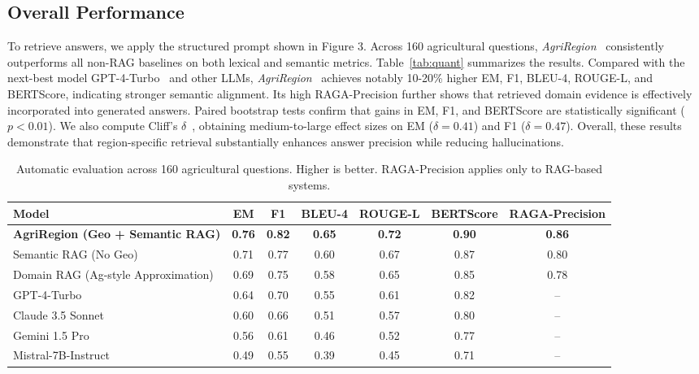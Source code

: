 \documentclass{ieeeaccess}
\newcommand{\AgriRegion}{\textit{AgriRegion}}
\begin{document}
\subsection{Overall Performance}
To retrieve answers, we apply the structured prompt shown in Figure 3. Across 160 agricultural questions, \AgriRegion~ consistently outperforms all non-RAG baselines on both lexical and semantic metrics. Table~\ref{tab:quant} summarizes the results. Compared with the next-best model GPT-4-Turbo~\cite{openai2024gpt4t} and other LLMs, \AgriRegion~ achieves notably 10-20\% higher EM, F1, BLEU-4, ROUGE-L, and BERTScore, indicating stronger semantic alignment. Its high RAGA-Precision further shows that retrieved domain evidence is effectively incorporated into generated answers. Paired bootstrap tests confirm that gains in EM, F1, and BERTScore are statistically significant ($p<0.01$). We also compute Cliff’s $\delta$~\cite{cliff1993dominance}, obtaining medium-to-large effect sizes on EM ($\delta=0.41$) and F1 ($\delta=0.47$). Overall, these results demonstrate that region-specific retrieval substantially enhances answer precision while reducing hallucinations.

\begin{table}[t]
\centering
\caption{Automatic evaluation across 160 agricultural questions. Higher is better. RAGA-Precision applies only to RAG-based systems.}
\begin{tabular}{lcccccc}
\toprule
Model & EM & F1 & BLEU-4 & ROUGE-L & BERTScore & RAGA-Precision \\
\midrule
\textbf{AgriRegion (Geo + Semantic RAG)} & \textbf{0.76} & \textbf{0.82} & \textbf{0.65} & \textbf{0.72} & \textbf{0.90} & \textbf{0.86} \\
\midrule
Semantic RAG (No Geo) & 0.71 & 0.77 & 0.60 & 0.67 & 0.87 & 0.80 \\
Domain RAG (Ag-style Approximation) & 0.69 & 0.75 & 0.58 & 0.65 & 0.85 & 0.78 \\
\midrule
GPT-4-Turbo & 0.64 & 0.70 & 0.55 & 0.61 & 0.82 & -- \\
Claude 3.5 Sonnet & 0.60 & 0.66 & 0.51 & 0.57 & 0.80 & -- \\
Gemini 1.5 Pro & 0.56 & 0.61 & 0.46 & 0.52 & 0.77 & -- \\
Mistral-7B-Instruct & 0.49 & 0.55 & 0.39 & 0.45 & 0.71 & -- \\
\bottomrule
\end{tabular}
\label{tab:main_results}
\end{table}
\end{document}
